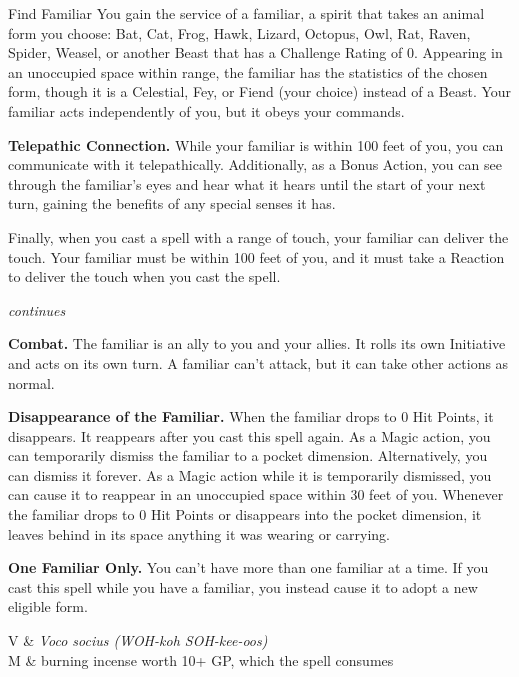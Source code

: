 \begin{Spell}[
  tags=Ritual,
  level=1st,
  time=1 Hour,
  range=10 ft,
  components={V, S, M},
  duration=Instantaneous,
  school=Conjuration,
  attack=None,
  effect=Summoning
]{Find Familiar}
You gain the service of a familiar, a spirit that takes an animal form you choose: Bat, Cat, Frog, Hawk, Lizard, Octopus, Owl, Rat, Raven, Spider, Weasel, or another Beast that has a Challenge Rating of 0. Appearing in an unoccupied space within range, the familiar has the statistics of the chosen form, though it is a Celestial, Fey, or Fiend (your choice) instead of a Beast. Your familiar acts independently of you, but it obeys your commands.

\textbf{Telepathic Connection.} While your familiar is within 100 feet of you, you can communicate with it telepathically. Additionally, as a Bonus Action, you can see through the familiar's eyes and hear what it hears until the start of your next turn, gaining the benefits of any special senses it has.

Finally, when you cast a spell with a range of touch, your familiar can deliver the touch. Your familiar must be within 100 feet of you, and it must take a Reaction to deliver the touch when you cast the spell.

\hfill \textit{\footnotesize continues}
\newpage
{}

\textbf{Combat.} The familiar is an ally to you and your allies. It rolls its own Initiative and acts on its own turn. A familiar can't attack, but it can take other actions as normal.

\textbf{Disappearance of the Familiar.} When the familiar drops to 0 Hit Points, it disappears. It reappears after you cast this spell again. As a Magic action, you can temporarily dismiss the familiar to a pocket dimension. Alternatively, you can dismiss it forever. As a Magic action while it is temporarily dismissed, you can cause it to reappear in an unoccupied space within 30 feet of you. Whenever the familiar drops to 0 Hit Points or disappears into the pocket dimension, it leaves behind in its space anything it was wearing or carrying.

\textbf{One Familiar Only.} You can't have more than one familiar at a time. If you cast this spell while you have a familiar, you instead cause it to adopt a new eligible form.

\begin{components}
V & \textit{Voco socius (WOH-koh SOH-kee-oos)} \\
M & burning incense worth 10+ GP, which the spell consumes
\end{components}
\end{Spell}


